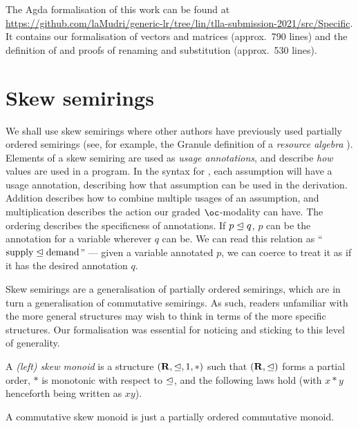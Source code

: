 \documentclass[submission,copyright,creativecommons]{eptcs}
\begin{document}
The Agda formalisation of this work can be found at
\url{https://github.com/laMudri/generic-lr/tree/lin/tlla-submission-2021/src/Specific}.
It contains our formalisation of vectors and
matrices (approx.\ 790 lines) and the definition of \name{} and proofs of
renaming and substitution (approx.\ 530 lines).

\section{Skew semirings}\label{sec:algebra}

We shall use skew semirings where other authors have previously used partially ordered
semirings (see, for example, the Granule definition of a \emph{resource algebra}
\cite{Granule18}).
Elements of a skew semiring are used as \emph{usage annotations}, and describe
\emph{how} values are used in a program.
In the syntax for \name{}, each assumption will have a usage annotation,
describing how that assumption can be used in the derivation.
Addition describes how to combine multiple usages of an assumption, and
multiplication describes the action our graded $\oc$-modality can have.
The ordering describes the specificness of annotations.
If $p \trianglelefteq q$, $p$ can be the annotation for a variable wherever $q$ can be.
We can read this relation as ``$\textrm{supply} \trianglelefteq \textrm{demand}$'' ---
given a variable annotated $p$, we can coerce to treat it as if it has the
desired annotation $q$.

Skew semirings are a generalisation of partially ordered semirings, which are in turn a
generalisation of commutative semirings.
As such, readers unfamiliar with the more general structures may wish to think
in terms of the more specific structures.
Our formalisation was essential for noticing and sticking to this level of
generality.

\begin{definition}
  A \emph{(left) skew monoid} is a structure $(\mathbf R, \trianglelefteq, 1, *)$ such
  that $(\mathbf R, \trianglelefteq)$ forms a partial order, $*$ is monotonic with
  respect to $\trianglelefteq$, and the following laws hold (with $x * y$ henceforth
  being written as $xy$).
\end{definition}

\begin{remark}
  A commutative skew monoid is just a partially ordered commutative monoid.
\end{remark}
\end{document}
